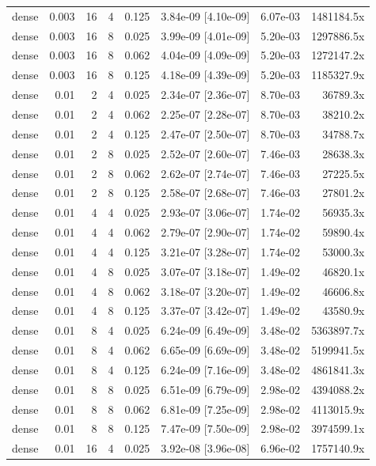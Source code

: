 \begin{tabular}{lrrrrrrr}
dense & 0.003 & 16 & 4 & 0.125 & 3.84e-09 [4.10e-09] & 6.07e-03 & 1481184.5x \\
dense & 0.003 & 16 & 8 & 0.025 & 3.99e-09 [4.01e-09] & 5.20e-03 & 1297886.5x \\
dense & 0.003 & 16 & 8 & 0.062 & 4.04e-09 [4.09e-09] & 5.20e-03 & 1272147.2x \\
dense & 0.003 & 16 & 8 & 0.125 & 4.18e-09 [4.39e-09] & 5.20e-03 & 1185327.9x \\
dense & 0.01 & 2 & 4 & 0.025 & 2.34e-07 [2.36e-07] & 8.70e-03 & 36789.3x \\
dense & 0.01 & 2 & 4 & 0.062 & 2.25e-07 [2.28e-07] & 8.70e-03 & 38210.2x \\
dense & 0.01 & 2 & 4 & 0.125 & 2.47e-07 [2.50e-07] & 8.70e-03 & 34788.7x \\
dense & 0.01 & 2 & 8 & 0.025 & 2.52e-07 [2.60e-07] & 7.46e-03 & 28638.3x \\
dense & 0.01 & 2 & 8 & 0.062 & 2.62e-07 [2.74e-07] & 7.46e-03 & 27225.5x \\
dense & 0.01 & 2 & 8 & 0.125 & 2.58e-07 [2.68e-07] & 7.46e-03 & 27801.2x \\
dense & 0.01 & 4 & 4 & 0.025 & 2.93e-07 [3.06e-07] & 1.74e-02 & 56935.3x \\
dense & 0.01 & 4 & 4 & 0.062 & 2.79e-07 [2.90e-07] & 1.74e-02 & 59890.4x \\
dense & 0.01 & 4 & 4 & 0.125 & 3.21e-07 [3.28e-07] & 1.74e-02 & 53000.3x \\
dense & 0.01 & 4 & 8 & 0.025 & 3.07e-07 [3.18e-07] & 1.49e-02 & 46820.1x \\
dense & 0.01 & 4 & 8 & 0.062 & 3.18e-07 [3.20e-07] & 1.49e-02 & 46606.8x \\
dense & 0.01 & 4 & 8 & 0.125 & 3.37e-07 [3.42e-07] & 1.49e-02 & 43580.9x \\
dense & 0.01 & 8 & 4 & 0.025 & 6.24e-09 [6.49e-09] & 3.48e-02 & 5363897.7x \\
dense & 0.01 & 8 & 4 & 0.062 & 6.65e-09 [6.69e-09] & 3.48e-02 & 5199941.5x \\
dense & 0.01 & 8 & 4 & 0.125 & 6.24e-09 [7.16e-09] & 3.48e-02 & 4861841.3x \\
dense & 0.01 & 8 & 8 & 0.025 & 6.51e-09 [6.79e-09] & 2.98e-02 & 4394088.2x \\
dense & 0.01 & 8 & 8 & 0.062 & 6.81e-09 [7.25e-09] & 2.98e-02 & 4113015.9x \\
dense & 0.01 & 8 & 8 & 0.125 & 7.47e-09 [7.50e-09] & 2.98e-02 & 3974599.1x \\
dense & 0.01 & 16 & 4 & 0.025 & 3.92e-08 [3.96e-08] & 6.96e-02 & 1757140.9x \\

\end{tabular}
